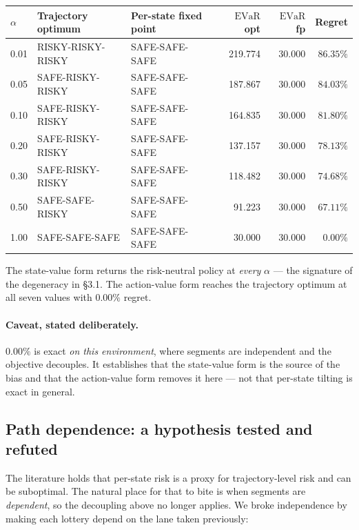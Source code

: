 \documentclass[11pt,a4paper]{article}
\newcommand{\evar}{\mathrm{EVaR}}
\begin{document}
\begin{center}
\small
\begin{tabular}{@{}lllrrr@{}}
\toprule
$\alpha$ & Trajectory optimum & Per-state fixed point & $\evar$ opt & $\evar$ fp & Regret \\
\midrule
0.01 & RISKY-RISKY-RISKY & SAFE-SAFE-SAFE & 219.774 & 30.000 & $86.35\%$ \\
0.05 & SAFE-RISKY-RISKY  & SAFE-SAFE-SAFE & 187.867 & 30.000 & $84.03\%$ \\
0.10 & SAFE-RISKY-RISKY  & SAFE-SAFE-SAFE & 164.835 & 30.000 & $81.80\%$ \\
0.20 & SAFE-RISKY-RISKY  & SAFE-SAFE-SAFE & 137.157 & 30.000 & $78.13\%$ \\
0.30 & SAFE-RISKY-RISKY  & SAFE-SAFE-SAFE & 118.482 & 30.000 & $74.68\%$ \\
0.50 & SAFE-SAFE-RISKY   & SAFE-SAFE-SAFE &  91.223 & 30.000 & $67.11\%$ \\
1.00 & SAFE-SAFE-SAFE    & SAFE-SAFE-SAFE &  30.000 & 30.000 & $0.00\%$ \\
\bottomrule
\end{tabular}
\end{center}

\noindent The state-value form returns the risk-neutral policy at \emph{every}
$\alpha$ --- the signature of the degeneracy in \S3.1. The action-value form
reaches the trajectory optimum at all seven values with $0.00\%$ regret.

\paragraph{Caveat, stated deliberately.} $0.00\%$ is exact \emph{on this
environment}, where segments are independent and the objective decouples. It
establishes that the state-value form is the source of the bias and that the
action-value form removes it here --- not that per-state tilting is exact in
general.

\subsection{Path dependence: a hypothesis tested and refuted}

The literature holds that per-state risk is a proxy for trajectory-level risk and
can be suboptimal. The natural place for that to bite is when segments are
\emph{dependent}, so the decoupling above no longer applies. We broke independence
by making each lottery depend on the lane taken previously:
\end{document}

